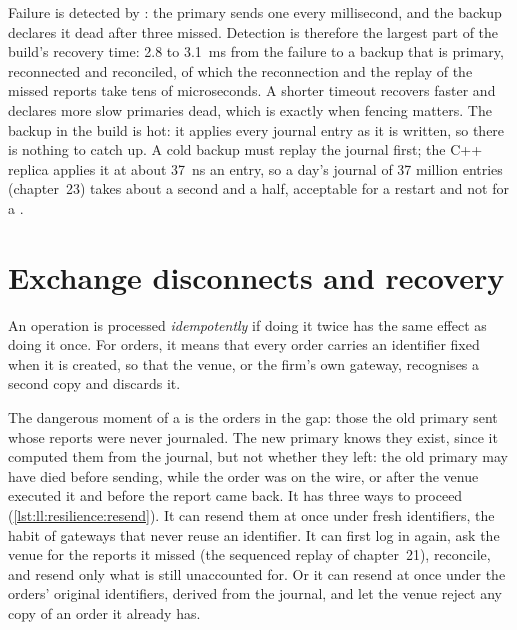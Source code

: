 Failure is detected by : the primary sends one every millisecond, and the backup declares it dead after three
missed. Detection is therefore the largest part of the build's recovery time: 2.8 to \qty{3.1}{\milli\second} from the failure
to a backup that is primary, reconnected and reconciled, of which the reconnection and the replay of the missed reports take
tens of microseconds. A shorter timeout recovers faster and declares more slow primaries dead, which is exactly when fencing
matters. The backup in the build is hot: it applies every journal entry as it is written, so there is nothing to catch up. A
cold backup must replay the journal first; the C++ replica applies it at about \qty{37}{\nano\second} an entry, so a day's
journal of 37 million entries (chapter~23) takes about a second and a half, acceptable for a restart and not for a .

\section{Exchange disconnects and recovery}

\begin{definition}\label{def:ll:resilience:idempotent}
An operation is processed \emph{idempotently} if doing it twice has the same effect as doing it
once. For orders, it means that every order carries an identifier fixed when it is created, so that the venue, or the firm's
own gateway, recognises a second copy and discards it.
\end{definition}

The dangerous moment of a  is the orders in the gap: those the old primary sent whose reports were never journaled.
The new primary knows they exist, since it computed them from the journal, but not whether they left: the old primary may
have died before sending, while the order was on the wire, or after the venue executed it and before the report came back. It
has three ways to proceed (\cref{lst:ll:resilience:resend}). It can resend them at once under fresh identifiers, the habit of
gateways that never reuse an identifier. It can first log in again, ask the venue for the reports it missed (the sequenced
replay of chapter~21), reconcile, and resend only what is still unaccounted for. Or it can resend at once under the orders'
original identifiers, derived from the journal, and let the venue reject any copy of an order it already has.

